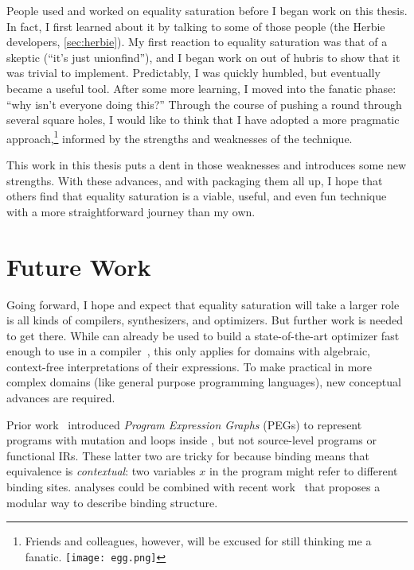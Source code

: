 People used and worked on equality saturation before
 I began work on this thesis.
In fact,
 I first learned about it by
 talking to some of those people (the Herbie developers, \autoref{sec:herbie}).
My first reaction
 to equality saturation was that of a skeptic (``it's just unionfind''),
 and I began
 work on \egg out of hubris to show that it was trivial to implement.
Predictably, I was quickly humbled,
 but eventually \egg became a useful tool.
After some more learning,
 I moved into the fanatic phase: ``why isn't everyone doing this?''
Through the course of pushing a round \egg through several square holes,
 I would like to think that I have adopted a more pragmatic approach,\footnote{
   Friends and colleagues, however, will be excused for still thinking
   me a fanatic. \texttt{[image: egg.png]}
}
 informed by the strengths and weaknesses of the technique.

This work in this thesis puts a dent in those weaknesses
 and introduces some new strengths.
With these advances,
 and with \egg packaging them all up,
 I hope that others find that equality saturation
 is a viable, useful, and even fun
 technique with a more straightforward journey than my own.

\section{Future Work}

Going forward,
 I hope and expect that equality saturation will
 take a larger role is all kinds
 of compilers, synthesizers, and optimizers.
But further work is needed to get there.
While \egg can already be used to build
 a state-of-the-art optimizer
 fast enough to use in a compiler~\cite{tensat},
 this only applies for domains
 with algebraic, context-free interpretations of their expressions.
To make \eqsat practical in more complex domains
 (like general purpose programming languages),
 new conceptual advances are required.

Prior work~\cite{eqsat} introduced
 \textit{Program Expression Graphs} (PEGs)
 to represent programs with mutation and loops inside \egraphs,
 but not
 source-level programs or functional IRs.
These latter two are tricky for \egraphs because binding means
 that equivalence is \textit{contextual}:
 two variables $x$ in the program might refer to different binding sites.
\Eclass analyses could be combined
 with recent work~\cite{hashing-alpha} that
 proposes a modular way to describe binding structure.


